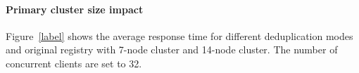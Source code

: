 \paragraph{Primary cluster size  impact}
Figure~\ref{label} shows the average response time for different deduplication modes and original registry
with 7-node cluster and 14-node cluster.
The number of concurrent clients are set to 32.




